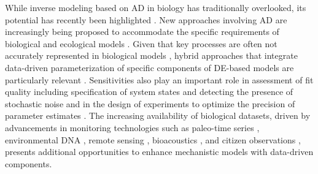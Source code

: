 While inverse modeling based on AD in biology has traditionally overlooked, its potential has recently been highlighted \cite{frank2022, alsos2023}. 
New approaches involving AD are increasingly being proposed to accommodate the specific requirements of biological and ecological models \cite{Yazdani2020, Boussange2024,Lagergren_Nardini_Baker_Simpson_Flores_2020,paredes2023}. 
Given that key processes are often not accurately represented in biological models \cite{hartig2012, Schartau2017, chalmandrier2021}, hybrid approaches that integrate data-driven parameterization of specific components of DE-based models are particularly relevant \cite{ramsay1996principal, cao2008estimating, paul2011semiparametric, chen2017network, rasp2018, dai2022kernel, Boussange2024}.
Sensitivities also play an important role in assessment of fit quality including specification of system states and detecting the presence of stochastic noise \cite{hooker2009forcing,hooker2015goodness,liu2023specification} and in the design of experiments to optimize the precision of parameter estimates \cite{bauer2000numerical}. 
The increasing availability of biological datasets, driven by advancements in monitoring technologies such as paleo-time series \cite{alsos2023}, environmental DNA \cite{Ruppert2019}, remote sensing \cite{Jetz2019}, bioacoustics \cite{Aide2013}, and citizen observations \cite{GBIF}, presents additional opportunities to enhance mechanistic models with data-driven components.
